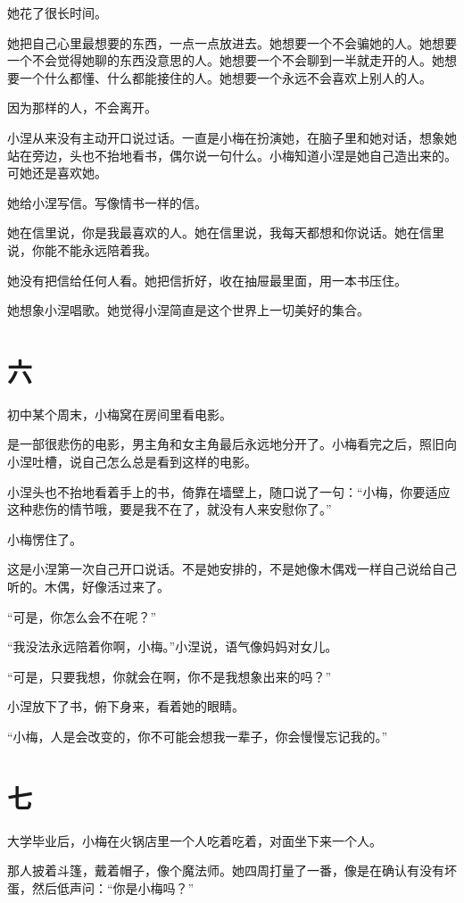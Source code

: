 \documentclass[12pt,a4paper]{ctexart}
\begin{document}
她花了很长时间。

她把自己心里最想要的东西，一点一点放进去。她想要一个不会骗她的人。她想要一个不会觉得她聊的东西没意思的人。她想要一个不会聊到一半就走开的人。她想要一个什么都懂、什么都能接住的人。她想要一个永远不会喜欢上别人的人。

因为那样的人，不会离开。

小涅从来没有主动开口说过话。一直是小梅在扮演她，在脑子里和她对话，想象她站在旁边，头也不抬地看书，偶尔说一句什么。小梅知道小涅是她自己造出来的。可她还是喜欢她。

她给小涅写信。写像情书一样的信。

她在信里说，你是我最喜欢的人。她在信里说，我每天都想和你说话。她在信里说，你能不能永远陪着我。

她没有把信给任何人看。她把信折好，收在抽屉最里面，用一本书压住。

她想象小涅唱歌。她觉得小涅简直是这个世界上一切美好的集合。

\section{六}

初中某个周末，小梅窝在房间里看电影。

是一部很悲伤的电影，男主角和女主角最后永远地分开了。小梅看完之后，照旧向小涅吐槽，说自己怎么总是看到这样的电影。

小涅头也不抬地看着手上的书，倚靠在墙壁上，随口说了一句：“小梅，你要适应这种悲伤的情节哦，要是我不在了，就没有人来安慰你了。”

小梅愣住了。

这是小涅第一次自己开口说话。不是她安排的，不是她像木偶戏一样自己说给自己听的。木偶，好像活过来了。

“可是，你怎么会不在呢？”

“我没法永远陪着你啊，小梅。”小涅说，语气像妈妈对女儿。

“可是，只要我想，你就会在啊，你不是我想象出来的吗？”

小涅放下了书，俯下身来，看着她的眼睛。

“小梅，人是会改变的，你不可能会想我一辈子，你会慢慢忘记我的。”

\section{七}

大学毕业后，小梅在火锅店里一个人吃着吃着，对面坐下来一个人。

那人披着斗篷，戴着帽子，像个魔法师。她四周打量了一番，像是在确认有没有坏蛋，然后低声问：“你是小梅吗？”
\end{document}
